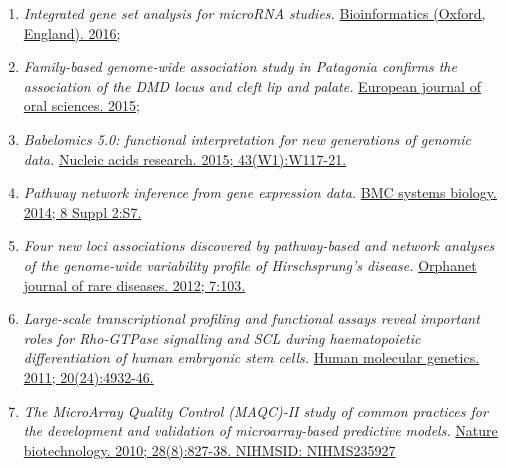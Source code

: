 

\begin{enumerate}
\def\labelenumi{\arabic{enumi}.}

\item
  \emph{Integrated gene set analysis for microRNA studies.}
  \href{http://www.ncbi.nlm.nih.gov//pubmed/27324197}{Bioinformatics
  (Oxford, England). 2016;}

\item
  \emph{Family-based genome-wide association study in Patagonia confirms
  the association of the DMD locus and cleft lip and palate.} 
  \href{http://www.ncbi.nlm.nih.gov//pubmed/26331285}{European journal
  of oral sciences. 2015;}

\item
  \emph{Babelomics 5.0: functional interpretation for new generations of
  genomic data.} 
  \href{http://www.ncbi.nlm.nih.gov//pubmed/25897133}{Nucleic acids
  research. 2015; 43(W1):W117-21.}

\item
  \emph{Pathway network inference from gene expression data.} 
  \href{http://www.ncbi.nlm.nih.gov//pubmed/25032889}{BMC
  systems biology. 2014; 8 Suppl 2:S7.}

\item
  \emph{Four new loci associations discovered by pathway-based and
  network analyses of the genome-wide variability profile of
  Hirschsprung's disease.} 
  \href{http://www.ncbi.nlm.nih.gov//pubmed/23270508}{Orphanet journal
  of rare diseases. 2012; 7:103.}

\item
  \emph{Large-scale transcriptional profiling and functional assays
  reveal important roles for Rho-GTPase signalling and SCL during
  haematopoietic differentiation of human embryonic stem cells.} 
  \href{http://www.ncbi.nlm.nih.gov//pubmed/21937587}{Human molecular
  genetics. 2011; 20(24):4932-46.}

\item
  \emph{The MicroArray Quality Control (MAQC)-II study of common
  practices for the development and validation of microarray-based
  predictive models.} 
  \href{http://www.ncbi.nlm.nih.gov//pubmed/20676074}{Nature
  biotechnology. 2010; 28(8):827-38. NIHMSID: NIHMS235927}


\end{enumerate}

